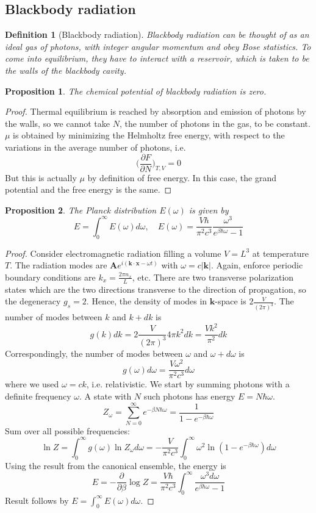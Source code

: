 \documentclass[a4paper]{article}
\theoremstyle{new}
\newtheorem{defi}{Definition}[section]
\newtheorem{prop}{Proposition}[section]
\begin{document}
\subsection{Blackbody radiation}
\begin{defi}[Blackbody radiation]
Blackbody radiation can be thought of as an ideal gas of photons, with integer angular momentum and obey Bose statistics. To come into equilibrium, they have to interact with a reservoir, which is taken to be the walls of the blackbody cavity.
\end{defi}
\begin{prop}
The chemical potential of blackbody radiation is zero.
\end{prop}
\begin{proof}
Thermal equilibrium is reached by absorption and emission of photons by the walls, so we cannot take $N$, the number of photons in the gas, to be constant. $\mu$ is obtained by minimizing the Helmholtz free energy, with respect to the variations in the average number of photons, i.e.
$$\bigg(\frac{\partial F}{\partial N}\bigg)_{T,V}=0$$
But this is actually $\mu$ by definition of free energy. In this case, the grand potential and the free energy is the same.
\end{proof}
\begin{prop}
The Planck distribution $E(\omega)$ is given by
$$E=\int_0^\infty E(\omega)d\omega,\quad E(\omega)=\frac{V\hbar}{\pi^2c^3}\frac{\omega^3}{e^{\beta\hbar\omega}-1}$$
\end{prop}
\begin{proof}
Consider electromagnetic radiation filling a volume $V=L^3$ at temperature $T$. The radiation modes are $\mathbf{A}e^{i(\mathbf{k}\cdot\mathbf{x}-\omega t)}$ with $\omega=c|\mathbf{k}|$. Again, enforce periodic boundary conditions are $k_x=\frac{2\pi n_x}{L}$, etc. There are two transverse polarization states which are the two directions transverse to the direction of propagation, so the degeneracy $g_s=2$. Hence, the density of modes in $\mathbf{k}$-space is $2\frac{V}{(2\pi)^3}$. The number of modes between $k$ and $k+dk$ is 
$$g(k)dk=2\frac{V}{(2\pi)^3}4\pi k^2dk=\frac{Vk^2}{\pi^2}dk$$
Correspondingly, the number of modes between $\omega$ and $\omega+d\omega$ is 
$$g(\omega)d\omega=\frac{V\omega^2}{\pi^2c^3}d\omega$$
where we used $\omega=ck$, i.e. relativistic. We start by summing photons with a definite frequency $\omega$. A state with $N$ such photons has energy $E=N\hbar\omega$.
$$Z_\omega=\sum_{N=0}^\infty e^{-\beta N\hbar\omega}=\frac{1}{1-e^{-\beta\hbar\omega}}$$
Sum over all possible frequencies:
$$\ln Z=\int_0^\infty g(\omega)\ln Z_\omega d\omega=-\frac{V}{\pi^2c^3}\int_0^\infty\omega^2\ln(1-e^{-\beta\hbar\omega})d\omega$$
Using the result from the canonical ensemble, the energy is
$$E=-\frac{\partial}{\partial\beta}\log Z=\frac{V\hbar}{\pi^2c^3}\int_0^\infty\frac{\omega^3d\omega}{e^{\beta\hbar\omega}-1}$$
Result follows by $E=\int_0^\infty E(\omega)d\omega$.
\end{proof}
\end{document}
